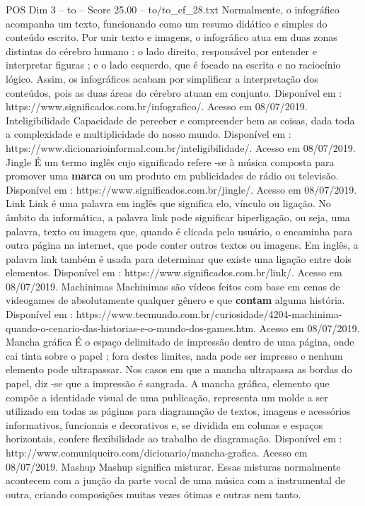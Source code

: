 \begin{textsample}{POS Dim 3 – to – Score 25.00 – to/to\_ef\_28.txt}
Normalmente, o infográfico acompanha um texto, funcionando como um resumo didático e simples do conteúdo escrito.
Por unir texto e imagens, o infográfico atua em duas zonas distintas do cérebro humano : o lado direito, responsável por entender e interpretar figuras ; e o lado esquerdo, que é focado na escrita e no raciocínio lógico.
Assim, os infográficos acabam por simplificar a interpretação dos conteúdos, pois as duas áreas do cérebro atuam em conjunto.
Disponível em : https://www.significados.com.br/infografico/.
Acesso em 08/07/2019.
Inteligibilidade Capacidade de perceber e compreender bem as coisas, dada toda a complexidade e multiplicidade do nosso mundo.
Disponível em : https://www.dicionarioinformal.com.br/inteligibilidade/.
Acesso em 08/07/2019.
Jingle É um termo inglês cujo significado refere -se à música composta para promover uma \textbf{marca} ou um produto em publicidades de rádio ou televisão.
Disponível em : https://www.significados.com.br/jingle/.
Acesso em 08/07/2019.
Link Link é uma palavra em inglês que significa elo, vínculo ou ligação.
No âmbito da informática, a palavra link pode significar hiperligação, ou seja, uma palavra, texto ou imagem que, quando é clicada pelo usuário, o encaminha para outra página na internet, que pode conter outros textos ou imagens.
Em inglês, a palavra link também é usada para determinar que existe uma ligação entre dois elementos.
Disponível em : https://www.significados.com.br/link/.
Acesso em 08/07/2019.
Machinimas Machinimas são vídeos feitos com base em cenas de videogames de absolutamente qualquer gênero e que \textbf{contam} alguma história.
Disponível em : https://www.tecmundo.com.br/curiosidade/4204-machinima-quando-o-cenario-das-historias-e-o-mundo-dos-games.htm.
Acesso em 08/07/2019.
Mancha gráfica É o espaço delimitado de impressão dentro de uma página, onde cai tinta sobre o papel ; fora destes limites, nada pode ser impresso e nenhum elemento pode ultrapassar.
Nos casos em que a mancha ultrapassa as bordas do papel, diz -se que a impressão é sangrada.
A mancha gráfica, elemento que compõe a identidade visual de uma publicação, representa um molde a ser utilizado em todas as páginas para diagramação de textos, imagens e acessórios informativos, funcionais e decorativos e, se dividida em colunas e espaços horizontais, confere flexibilidade ao trabalho de diagramação.
Disponível em : http://www.comuniqueiro.com/dicionario/mancha-grafica.
Acesso em 08/07/2019.
Mashup Mashup significa misturar.
Essas misturas normalmente acontecem com a junção da parte vocal de uma música com a instrumental de outra, criando composições muitas vezes ótimas e outras nem tanto.

\end{textsample}
